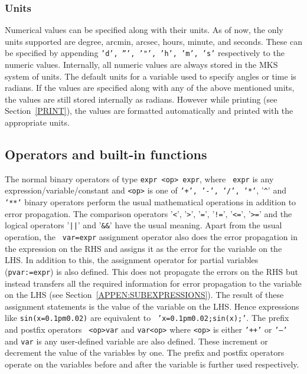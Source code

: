\documentclass[12pt]{article}
\begin{document}
\subsubsection{Units}
\label{UNITS}
   
Numerical values can be specified along with their units.  As of now,
the only units supported are degree, arcmin, arcsec, hours, minute,
and seconds.  These can be specified by appending {\tt 'd', ''', '"',
'h', 'm', 's'} respectively to the numeric values.  Internally, all
numeric values are always stored in the MKS system of units.  The
default units for a variable used to specify angles or time is
radians.  If the values are specified along with any of the above
mentioned units, the values are still stored internally as radians.
However while printing (see Section~\ref{PRINT}), the values are
formatted automatically and printed with the appropriate units.

\subsection{Operators and built-in functions}

The normal binary operators of type {\tt expr <op> expr}, where {\tt
expr} is any expression/variable/constant and {\tt <op>} is one of
{\tt '+', '-', '/', '*'}, '{\texttt{\^}}' and {\tt '**'} binary
operators perform the usual mathematical operations in addition to
error propagation.  The comparison operators '{\texttt{<}}',
'{\texttt{>}}', '{\texttt{=}}', '{\texttt{!}}{\texttt{=}}',
'{\texttt{<}}{\texttt{=}}', '{\texttt{>}}{\texttt{=}}' and the logical
operators '{\texttt{|}}{\texttt{|}}' and '{\texttt{\&}}{\texttt{\&}}'
have the usual meaning.  Apart from the usual operation, the {\tt
var=expr} assignment operator also does the error propagation in the
expression on the RHS and assigns it as the error for the variable on
the LHS.  In addition to this, the assignment operator for partial
variables ({\tt pvar:=expr}) is also defined.  This does not propagate
the errors on the RHS but instead transfers all the required
information for error propagation to the variable on the LHS (see
Section~\ref{APPEN:SUBEXPRESSIONS}).  The result of these assignment
statements is the value of the variable on the LHS.  Hence expressions
like {\tt sin(x=0.1pm0.02)} are equivalent to {\tt
'x=0.1pm0.02;sin(x);'}.  The prefix and postfix operators {\tt
<op>var} and {\tt var<op>} where {\tt <op>} is either {\tt '++'} or
{\tt '--'} and {\tt var} is any user-defined variable are also
defined.  These increment or decrement the value of the variables by
one.  The prefix and postfix operators operate on the variables before
and after the variable is further used respectively.
\end{document}
